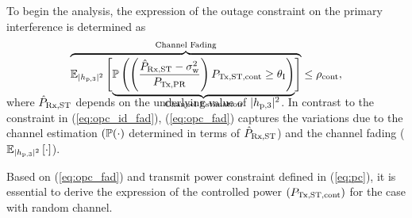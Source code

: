 To begin the analysis, the expression of the outage constraint on the primary interference is determined as 
\begin{align}
\smash[b]{\overbrace{{\mathbb E}_{|h_{\text{p,3}}|^2}\left[ \smash[b]{\underbrace{\mathbb P\left( \left( \frac{\hat{P}_{\text{Rx,ST}} - \sigma^2_{\text{w}}}{P_{\text{Tx,PR}}}\right) P_{\text{Tx,ST,cont}} \ge \theta_{\text{I}} \right)}_{\text{Channel Estimation}}} \right]}^{\text{Channel Fading}}} \le \rho_{\text{cont}}, \label{eq:opc_fad} \\[0.5em] 
\end{align}
where $\hat{P}_{\text{Rx,ST}}$ depends on the underlying value of $|h_{\text{p,3}}|^2$. In contrast to the constraint in (\ref{eq:opc_id_fad}), (\ref{eq:opc_fad}) captures the variations due to the channel estimation $(\mathbb P(\cdot)$ determined in terms of $\hat{P}_{\text{Rx,ST}}$) and the channel fading (${\mathbb E}_{|h_{\text{p,3}}|^2}\left[ \cdot \right]$). 

Based on (\ref{eq:opc_fad}) and transmit power constraint defined in (\ref{eq:pc}), it is essential to derive the expression of the controlled power $(P_{\text{Tx,ST,cont}})$ for the case with random channel.

